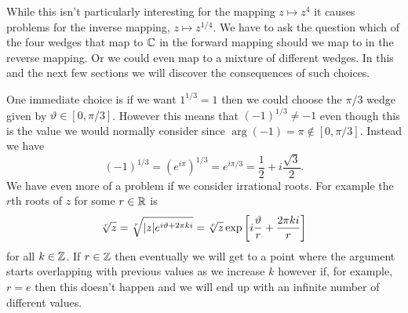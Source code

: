 \documentclass{article}
\begin{document}
    While this isn't particularly interesting for the mapping \(z\mapsto z^4\) it causes problems for the inverse mapping, \(z\mapsto z^{1/4}\).
    We have to ask the question which of the four wedges that map to \(\mathbb{C}\) in the forward mapping should we map to in the reverse mapping.
    Or we could even map to a mixture of different wedges.
    In this and the next few sections we will discover the consequences of such choices.
    
    One immediate choice is if we want \(1^{1/3} = 1\) then we could choose the \(\pi/3\) wedge given by \(\vartheta\in[0, \pi/3]\).
    However this means that \((-1)^{1/3} \ne -1\) even though this is the value we would normally consider since \(\arg(-1) = \pi \notin [0, \pi/3]\).
    Instead we have
    \[(-1)^{1/3} = (e^{i\pi})^{1/3} = e^{i\pi/3} = \frac{1}{2} + i\frac{\sqrt{3}}{2}.\]
    We have even more of a problem if we consider irrational roots.
    For example the \(r\)th roots of \(z\) for some \(r\in\mathbb{R}\) is
    \[\sqrt[r]{z} = \sqrt[r]{\abs{z}e^{i\vartheta + 2\pi ki}} = \sqrt[r]{z}\exp\left[i\frac{\vartheta}{r} + \frac{2\pi ki}{r}\right]\]
    for all \(k\in\mathbb{Z}\).
    If \(r\in\mathbb{Z}\) then eventually we will get to a point where the argument starts overlapping with previous values as we increase \(k\) however if, for example, \(r = e\) then this doesn't happen and we will end up with an infinite number of different values.
    
\end{document}
